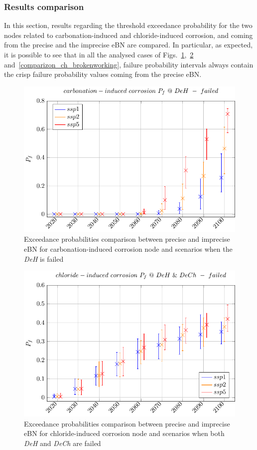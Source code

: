 \subsubsection{Results comparison}
In this section, results regarding the threshold exceedance probability for the two nodes related to carbonation-induced and chloride-induced corrosion, and coming from the precise and the imprecise eBN are compared. 
In particular, as expected, it is possible to see that in all the analysed cases of Figs.~\ref{comparizon_carb},~\ref{comparizon_ch_brokenbroken} and~\ref{comparizon_ch_brokenworking}, failure probability intervals always contain the crisp failure probability values coming from the precise eBN.
\begin{figure}[H]
    \centering
    \includegraphics[width=0.8\linewidth]{imgs/pdfs/22_carbonation_comparizon_broken.pdf}
    \caption{Exceedance probabilities comparison between precise and imprecise eBN for carbonation-induced corrosion node and scenarios when the \textit{DeH} is failed}\label{comparizon_carb}
\end{figure}

\begin{figure}[H]
    \centering
    \includegraphics[width=0.8\linewidth]{imgs/pdfs/20_Chloride_comparizon_brokenbroken.pdf}
    \caption{Exceedance probabilities comparison between precise and imprecise eBN for chloride-induced corrosion node and scenarios when both \textit{DeH} and \textit{DeCh} are failed}\label{comparizon_ch_brokenbroken}
\end{figure}

